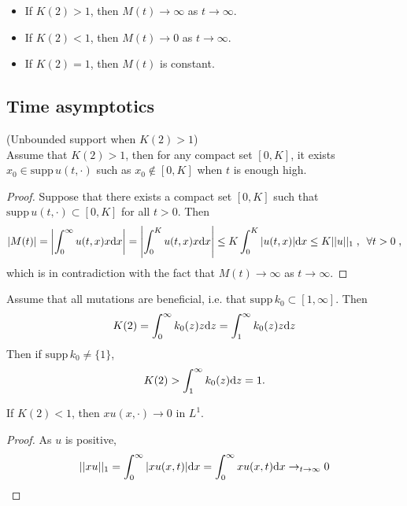 \documentclass[11pt]{amsart}
\newcommand{\supp}{\mathrm{supp}\,}
\begin{document}
\begin{corollary}
\begin{itemize}
    \item If $K(2) > 1$, then $M(t) \to \infty$ as $t \to \infty$.
    \item If $K(2) < 1$, then $M(t) \to 0$ as $t \to \infty$.
    \item If $K(2) = 1$, then $M(t)$ is constant.
\end{itemize}
\end{corollary}

\subsection{Time asymptotics}

\begin{theorem}(Unbounded support when $K(2) > 1$) \\
    Assume that $K(2) > 1$, then for any compact set $[0, K]$, it exists $x_0 \in \supp u(t, \cdot)$ such as $x_0 \notin [0, K]$ when $t$ is enough high.
\end{theorem}
\begin{proof}
Suppose that there exists a compact set $[0, K]$ such that $\supp u(t,\cdot) \subset [0, K]$ for all $t > 0$.
Then
    \begin{equation*}
        |M(t)| = \left| \int_0^\infty u(t,x) x \mathrm dx \right| = \left| \int_0^K u(t,x) x \mathrm dx \right| \leq K \int_0^K |u(t,x)| \mathrm dx \leq K ||u||_1 \; , \enspace \forall t > 0
        \; ,
    \end{equation*}
which is in contradiction with the fact that $M(t) \to \infty$ as $t \to \infty$.
\end{proof}

\begin{remark}
Assume that all mutations are beneficial, i.e. that $\supp k_0 \subset [1, \infty]$. Then 
    \begin{equation*}
        K(2) = \int_0^\infty k_0(z) z \mathrm dz =  \int_1^\infty k_0(z) z \mathrm dz
    \end{equation*}
Then if  $\supp k_0 \neq \{1\}$, 
    \begin{equation}
        K(2) >  \int_1^\infty k_0(z) \mathrm dz = 1.
    \end{equation}
\end{remark}

\begin{proposition}
    If $K(2) < 1$, then $xu(x,\cdot) \to 0$ in $L^1$.
\end{proposition}
\begin{proof}
As $u$ is positive, 
    \begin{equation*}
        ||xu||_1 = \int_0^\infty |x u(x,t)| \mathrm dx = \int_0^\infty x u(x,t) \mathrm dx \to_{t \to \infty} 0
    \end{equation*}
\end{proof}
\end{document}

